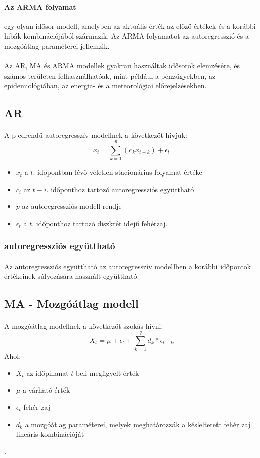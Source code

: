 \documentclass[11pt,a4paper]{article}
\begin{document}
				\paragraph{Az ARMA folyamat}
					egy olyan idősor-modell, amelyben az aktuális érték az előző értékek és a korábbi hibák kombinációjából származik. Az ARMA folyamatot az autoregresszió és a mozgóátlag paraméterei jellemzik.
				\paragraph{}
					Az AR, MA és ARMA modellek gyakran használtak idősorok elemzésére, és számos területen felhasználhatóak, mint például a pénzügyekben, az epidemiológiában, az energia- és a meteorológiai előrejelzésekben.
				\subsection{AR}
					\paragraph{}
						A p-edrendű autoregresszív modellnek a következőt hívjuk:
						$$x_t = \sum_{k=1}^{p}(c_k x_{t-k}) + \epsilon_t$$
						\begin{itemize}
							\item $x_t$ a $t.$ időpontban lévő véletlen stacionárius folyamat értéke
							\item $c_i$ az $t-i.$ időponthoz tartozó autoregressziós együttható
							\item $p$ az autoregressziós modell rendje
							\item $\epsilon_t$ a $t.$ időponthoz tartozó diszkrét idejű fehérzaj.
						\end{itemize}
					\subsubsection{autoregressziós együttható}
						\paragraph{}
							Az autoregressziós együttható az autoregresszív modellben a korábbi időpontok értékeinek súlyozására használt együttható.
				\subsection{MA - Mozgóátlag modell}
					\paragraph{}
						A mozgóátlag modellnek a következőt szokás hívni:
						$$X_t = \mu + \epsilon_t + \sum_{k = 1}^q d_k*\epsilon_{t-k}$$
						Ahol:
						\begin{itemize}
							\item $X_t$ az időpillanat $t$-beli megfigyelt érték
							\item $\mu$ a várható érték
							\item $\epsilon_t$ fehér zaj
							\item $d_k$ a mozgóátlag paraméterei, melyek meghatározzák a késleltetett fehér zaj lineáris kombinációját
						\end{itemize}.
\end{document}
